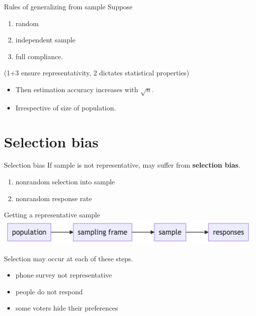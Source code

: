 \documentclass[
  ignorenonframetext,
  aspectratio=1610,
]{beamer}
\providecommand{\tightlist}{%
  \setlength{\itemsep}{0pt}\setlength{\parskip}{0pt}}
\begin{document}
\begin{frame}{Rules of generalizing from sample}
\protect\hypertarget{rules-of-generalizing-from-sample}{}
Suppose

\begin{enumerate}
\tightlist
\item
  random
\item
  independent sample
\item
  full compliance.
\end{enumerate}

(1+3 ensure representativity, 2 dictates statistical properties)

\begin{itemize}
\tightlist
\item
  Then estimation accuracy increases with \(\sqrt{n}\).
\item
  Irrespective of size of population.
\end{itemize}
\end{frame}

\hypertarget{selection-bias}{%
\section{Selection bias}\label{selection-bias}}

\begin{frame}{Selection bias}
\protect\hypertarget{selection-bias-1}{}
If sample is not representative, may suffer from \textbf{selection
bias}.

\begin{enumerate}
\tightlist
\item
  nonrandom selection into sample
\item
  nonrandom response rate
\end{enumerate}
\end{frame}

\begin{frame}{Getting a representative sample}
\protect\hypertarget{getting-a-representative-sample}{}
\includegraphics{exhibit/fig/selection-bias.png}

Selection may occur at each of these steps.

\begin{itemize}
\tightlist
\item
  phone survey not representative
\item
  people do not respond
\item
  some voters hide their preferences
\end{itemize}
\end{frame}
\end{document}
